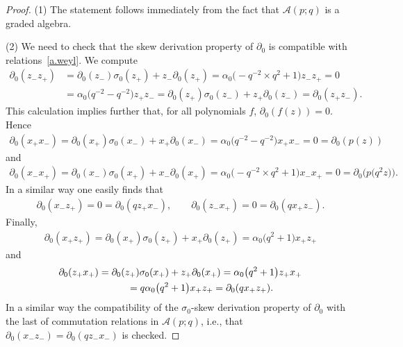 \documentclass[10pt,a4paper]{amsart}
\numberwithin{equation}{section}
\def\AWeyl#1#2{{\mathcal{A}}(#1;#2)}
\begin{document}
\begin{proof}
(1) The statement follows immediately from the fact that $\AWeyl p q$ is a graded algebra.

(2) We need to check that the skew derivation property of $\partial_0$ is compatible with rela\-tions~\eqref{a.weyl}. We compute
\begin{align*}
\partial_0(z_-z_+) &= \partial_0(z_-)\sigma_0(z_+) + z_- \partial_0(z_+) = \alpha_0\big({-}q^{-2} \times q^2 + 1\big)z_- z_+ = 0\\
&= \alpha_0\big(q^{-2} - q^{-2}\big) z_+ z_- = \partial_0(z_+)\sigma_0(z_-) + z_+ \partial_0(z_-) =\partial_0(z_+z_-).
\end{align*}
This calculation implies further that, for all polynomials $f$, $\partial_0(f(z)) =0$. Hence
\begin{gather*}
\partial_0 (x_+x_-) = \partial_0(x_+)\sigma_0(x_-) + x_+ \partial_0(x_-) = \alpha_0\big(q^{-2} - q^{-2}\big) x_+ x_- = 0 = \partial_0 (p(z))
\end{gather*}
and
\begin{gather*}
\partial_0(x_-x_+) = \partial_0(x_-)\sigma_0(x_+) + x_- \partial_0(x_+) = \alpha_0\big({-}q^{-2} \times q^2 + 1\big)x_- x_+ = 0 = \partial_0 \big(p\big(q^2z\big)\big).
\end{gather*}
In a similar way one easily f\/inds that
\begin{gather*}
\partial_0(x_-z_+) = 0 = \partial_0(qz_+x_-), \qquad \partial_0(z_-x_+) = 0 = \partial_0(qx_+z_-).
\end{gather*}
Finally,
\begin{gather*}
\partial_0(x_+z_+) = \partial_0(x_+)\sigma_0(z_+) + x_+ \partial_0(z_+) = \alpha_0\big( q^2 + 1\big)x_+ z_+
\end{gather*}
and
\begin{gather*}
\partial_0(z_+x_+) = \partial_0(z_+)\sigma_0(x_+) + z_+ \partial_0(x_+) = \alpha_0\big( q^2 + 1\big)z_+ x_+\\
 \hphantom{\partial_0(z_+x_+)}{} = q\alpha_0\big( q^2 + 1\big)x_+ z_+ = \partial_0(qx_+z_+) .
\end{gather*}
In a similar way the compatibility of the $\sigma_0$-skew derivation property of $\partial_0$ with the last of commutation relations in $\AWeyl p q$, i.e., that $\partial_0(x_-z_-) = \partial_0(q z_-x_-)$ is checked.


\end{proof}
\end{document}
